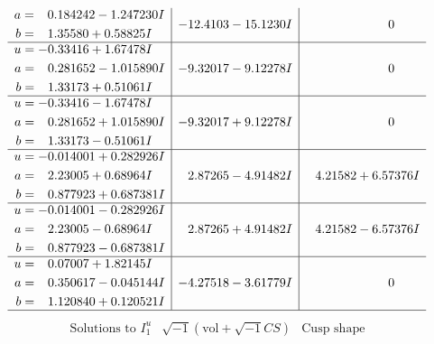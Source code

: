 \documentclass[1p]{elsarticle_modified}
\theoremstyle{definition}
\newcommand{\I}{\sqrt{-1}}
\begin{document}
$$\begin{array}{c|c|c}
\begin{aligned}
a &= \phantom{-}0.184242 - 1.247230 I \\
b &= \phantom{-}1.35580 + 0.58825 I\end{aligned}
 & -12.4103 - 15.1230 I & \phantom{-0.000000 } 0 \\ \hline\begin{aligned}
u &= -0.33416 + 1.67478 I \\
a &= \phantom{-}0.281652 - 1.015890 I \\
b &= \phantom{-}1.33173 + 0.51061 I\end{aligned}
 & -9.32017 - 9.12278 I & \phantom{-0.000000 } 0 \\ \hline\begin{aligned}
u &= -0.33416 - 1.67478 I \\
a &= \phantom{-}0.281652 + 1.015890 I \\
b &= \phantom{-}1.33173 - 0.51061 I\end{aligned}
 & -9.32017 + 9.12278 I & \phantom{-0.000000 } 0 \\ \hline\begin{aligned}
u &= -0.014001 + 0.282926 I \\
a &= \phantom{-}2.23005 + 0.68964 I \\
b &= \phantom{-}0.877923 + 0.687381 I\end{aligned}
 & \phantom{-}2.87265 - 4.91482 I & \phantom{-}4.21582 + 6.57376 I \\ \hline\begin{aligned}
u &= -0.014001 - 0.282926 I \\
a &= \phantom{-}2.23005 - 0.68964 I \\
b &= \phantom{-}0.877923 - 0.687381 I\end{aligned}
 & \phantom{-}2.87265 + 4.91482 I & \phantom{-}4.21582 - 6.57376 I \\ \hline\begin{aligned}
u &= \phantom{-}0.07007 + 1.82145 I \\
a &= \phantom{-}0.350617 - 0.045144 I \\
b &= \phantom{-}1.120840 + 0.120521 I\end{aligned}
 & -4.27518 - 3.61779 I & \phantom{-0.000000 } 0\\
 \hline 
 \end{array}$$\newpage$$\begin{array}{c|c|c}  
\text{Solutions to }I^u_{1}& \I (\text{vol} + \sqrt{-1}CS) & \text{Cusp shape}\\
 \hline 
\begin{aligned}

\end{aligned}
\end{array}$$
\end{document}
